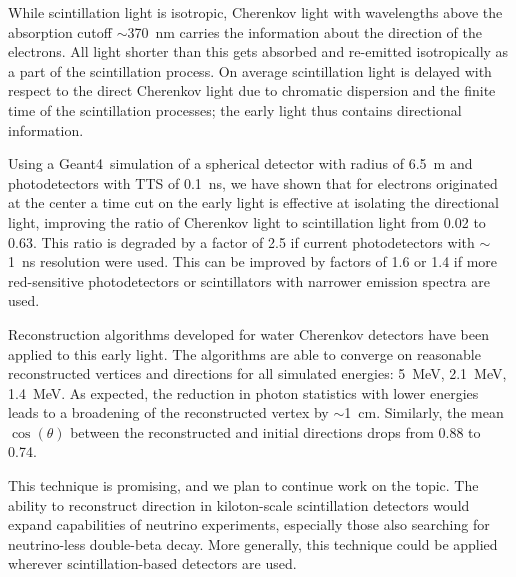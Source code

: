 \documentclass[cits]{JINST}
\begin{document}
While scintillation light is isotropic, Cherenkov light with wavelengths above the absorption cutoff $\sim$370~nm carries the information about the direction of the electrons. All light shorter than this gets absorbed and re-emitted isotropically as a part of the scintillation process. On average scintillation light is delayed with respect to the direct Cherenkov light due to chromatic dispersion and the finite time of the scintillation processes; the early light thus contains directional information.

Using a Geant4~simulation of a spherical detector with radius of 6.5~m and photodetectors with TTS of 0.1~ns, we have shown that for electrons originated at the center a time cut on the early light is effective at isolating the directional light, improving the ratio of Cherenkov light to scintillation light from 0.02 to 0.63. This ratio is degraded by a factor of 2.5 if current photodetectors with $\sim$1~ns resolution were used. This can be improved by factors of 1.6 or 1.4 if more red-sensitive photodetectors or scintillators with narrower emission spectra are used.

Reconstruction algorithms developed for water Cherenkov detectors have been applied to this early light. The algorithms are able to converge on reasonable reconstructed vertices and directions for all simulated energies: 5~MeV, 2.1~MeV, 1.4~MeV. As expected, the reduction in photon statistics with lower energies leads to a broadening of the reconstructed vertex by $\sim$1~cm. Similarly, the mean $\cos(\theta)$ between the reconstructed and initial directions drops from 0.88 to 0.74.

This technique is promising, and we plan to continue work on the topic. The ability to reconstruct direction in kiloton-scale scintillation detectors would expand capabilities of neutrino experiments, especially those also searching for neutrino-less double-beta decay. More generally, this technique could be applied wherever scintillation-based detectors are used.


\end{document}
